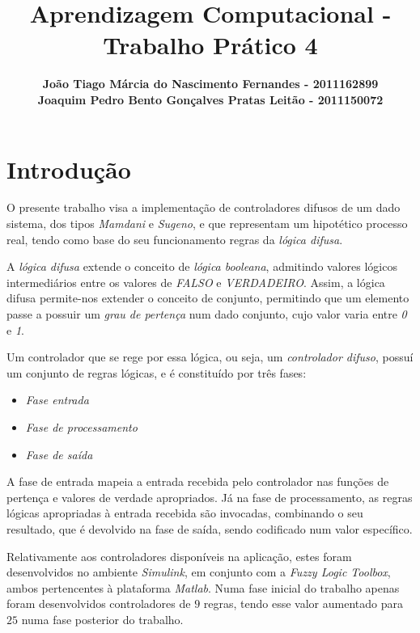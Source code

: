 \documentclass{article}
\title{\bf{Aprendizagem Computacional - Trabalho Prático 4}\vspace{80mm}}
\author{\textbf{João Tiago Márcia do Nascimento Fernandes - 2011162899} \\
\textbf{Joaquim Pedro Bento Gonçalves Pratas Leitão - 2011150072}}
\begin{document}
\maketitle

\pagebreak

\renewcommand*\contentsname{Índice}
\tableofcontents

\pagebreak

\section{Introdução}

O presente trabalho visa a implementação de controladores difusos de um dado sistema, dos tipos \emph{Mamdani} e \emph{Sugeno}, e que representam um hipotético processo real, tendo como base do seu funcionamento regras da \emph{lógica difusa}.

A \emph{lógica difusa} extende o conceito de \emph{lógica booleana}, admitindo valores lógicos intermediários entre os valores de \emph{FALSO} e \emph{VERDADEIRO}. Assim, a lógica difusa permite-nos extender o conceito de conjunto, permitindo que um elemento passe a possuir um \emph{grau de pertença} num dado conjunto, cujo valor varia entre \emph{0} e \emph{1}.

Um controlador que se rege por essa lógica, ou seja, um \emph{controlador difuso}, possuí um conjunto de regras lógicas, e é constituído por três fases:

\begin{itemize}
\item \emph{Fase entrada}
\item \emph{Fase de processamento}
\item \emph{Fase de saída}
\end{itemize}

A fase de entrada mapeia a entrada recebida pelo controlador nas funções de pertença e valores de verdade apropriados. Já na fase de processamento, as regras lógicas apropriadas à entrada recebida são invocadas, combinando o seu resultado, que é devolvido na fase de saída, sendo codificado num valor específico.

Relativamente aos controladores disponíveis na aplicação, estes foram desenvolvidos no ambiente \emph{Simulink}, em conjunto com a \emph{Fuzzy Logic Toolbox}, ambos pertencentes à plataforma \emph{Matlab}. Numa fase inicial do trabalho apenas foram desenvolvidos controladores de $9$ regras, tendo esse valor aumentado para $25$ numa fase posterior do trabalho.
\end{document}
